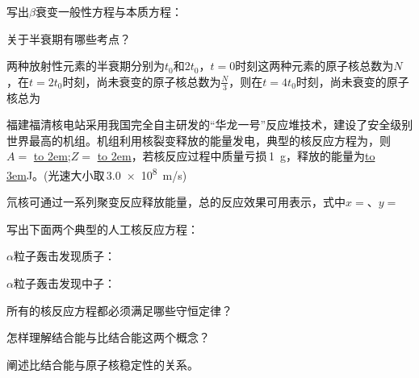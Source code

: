 写出\(\beta\)衰变一般性方程与本质方程：

\newpage
{}关于半衰期有哪些考点？
\vspace*{3cm}

	两种放射性元素的半衰期分别为\(t_0\)和\(2t_0\)，\(t = 0\)时刻这两种元素的原子核总数为\(N\)，在\(t=2t_0\)时刻，尚未衰变的原子核总数为\(\frac{N}{3}\)，则在\(t=4t_0\)时刻，尚未衰变的原子核总为\lunl{3em}

	福建福清核电站采用我国完全自主研发的“华龙一号”反应堆技术，建设了安全级别世界最高的机组。机组利用核裂变释放的能量发电，典型的核反应方程为，则\(A =\) \underline{\hbox to 2em{}};\(Z =\) \underline{\hbox to 2em{}}，若核反应过程中质量亏损\,\qty{1}{\g}，释放的能量为\underline{\hbox to 3em{}}J。(光速大小取\,\qty{3.0e8}{m/s})

氘核可通过一系列聚变反应释放能量，总的反应效果可用表示，式中\(x =\)\lunl{2em}、\(y =\)\lunl{2em}

写出下面两个典型的人工核反应方程：

\(\alpha\)粒子轰击发现质子：\lunl{20em}

\(\alpha\)粒子轰击发现中子：\lunl{20em}

所有的核反应方程都必须满足哪些守恒定律？
\vspace*{2cm}

怎样理解结合能与比结合能这两个概念？
\vspace*{6cm}

阐述比结合能与原子核稳定性的关系。